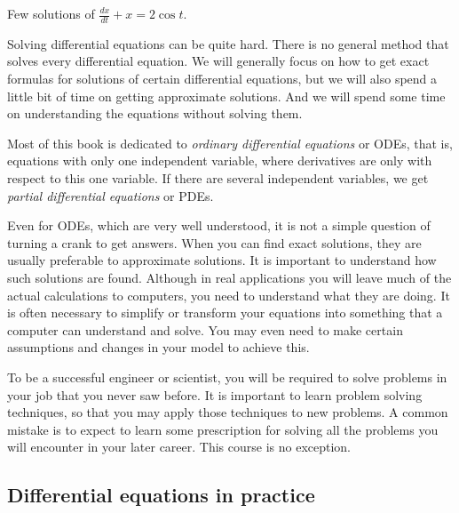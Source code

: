 \medskip

\begin{mywrapfig}{3.25in}
\capstart
{}
\caption{Few solutions of $\frac{dx}{dt} + x = 2 \cos t$.\label{intro:plotsfig}}
\end{mywrapfig}%


Solving differential equations can be quite hard.  
There is no general method that solves every differential equation.  We will
generally focus on how to get exact formulas for solutions of certain
differential
equations, but we will also spend a little bit of time
on getting approximate solutions.
And we will spend some time on understanding the equations without solving
them.

Most of this book is dedicated to
\emph{ordinary differential equations}
or ODEs, that is, equations with
only one independent variable, where derivatives are only with respect to
this one variable.
If there are several independent variables, we get
\emph{partial differential equations}
or PDEs.

Even for ODEs, which are very well understood, it is not a simple question
of turning a crank to get answers.  
When you can find exact solutions, they are usually preferable to 
approximate solutions.  It is important to understand how
such solutions are found.
Although in real applications you will
leave much of the actual calculations to computers, you
need to understand what they are doing.  It is often necessary
to simplify or transform your equations into something that a computer can
understand and solve.
You may even need to make certain assumptions and changes in your
model to achieve this.

To be a successful engineer or scientist, you will be required to solve
problems in your job that you never saw before.  It is important to
learn problem solving techniques, so that you may apply those techniques to
new problems.  A common mistake is to expect to learn some prescription for
solving all the problems you will encounter in your later career.  This
course is no exception.

\subsection{Differential equations in practice}


